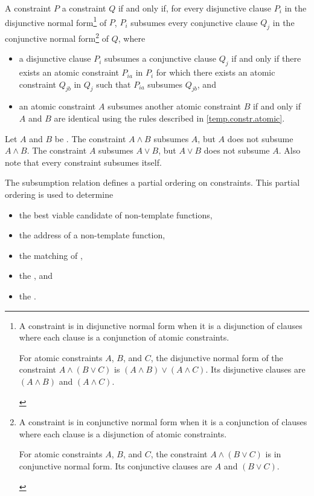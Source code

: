 \pnum
A constraint $P$  a constraint $Q$
if and only if,
for every disjunctive clause $P_i$
in the disjunctive normal form\footnote{
A constraint is in disjunctive normal form when it is a disjunction of
clauses where each clause is a conjunction of atomic constraints.
\begin{example}
For atomic constraints $A$, $B$, and $C$, the disjunctive normal form
of the constraint
$A \land (B \lor C)$
is
$(A \land B) \lor (A \land C)$.
%
Its disjunctive clauses are $(A \land B)$ and $(A \land C)$.
\end{example}
}
of $P$, $P_i$ subsumes every conjunctive clause $Q_j$
in the conjunctive normal form\footnote{
A constraint is in conjunctive normal form when it is a conjunction
of clauses where each clause is a disjunction of atomic constraints.
\begin{example}
For atomic constraints $A$, $B$, and $C$, the constraint
$A \land (B \lor C)$ is in conjunctive normal form.
%
Its conjunctive clauses are $A$ and $(B \lor C)$.
\end{example}
}
of $Q$, where
\begin{itemize}
\item
a disjunctive clause $P_i$ subsumes a conjunctive clause $Q_j$ if and only
if there exists an atomic constraint $P_{ia}$ in $P_i$ for which there exists
an atomic constraint $Q_{jb}$ in $Q_j$ such that $P_{ia}$ subsumes $Q_{jb}$, and

\item an atomic constraint $A$ subsumes another atomic constraint
$B$ if and only if $A$ and $B$ are identical using the
rules described in \ref{temp.constr.atomic}.
\end{itemize}
%
\begin{example}
Let $A$ and $B$ be .
%
The constraint $A \land B$ subsumes $A$, but $A$ does not subsume $A \land B$.
%
The constraint $A$ subsumes $A \lor B$, but $A \lor B$ does not subsume $A$.
%
Also note that every constraint subsumes itself.
\end{example}

\pnum
\begin{note}
The subsumption relation defines a partial ordering on constraints.
This partial ordering is used to determine
\begin{itemize}
\item the best viable candidate of non-template functions,
\item the address of a non-template function,
\item the matching of ,
\item the , and
\item the .
\end{itemize}
\end{note}

